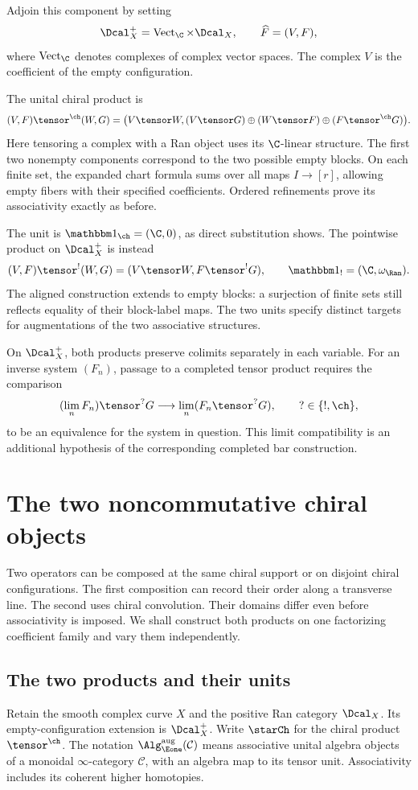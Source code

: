 Adjoin this component by setting
\[
 \Dcal_X^+=\operatorname{Vect}_{\C}\times\Dcal_X,
 \qquad \widehat F=(V,F),
\]
where $\operatorname{Vect}_{\C}$ denotes complexes of complex vector spaces.
The complex $V$ is the coefficient of the empty configuration.

The unital chiral product is
\[
 (V,F)\tensor^{\ch}(W,G)
 =\bigl(V\tensor W,
       (V\tensor G)\oplus(W\tensor F)\oplus(F\tensor^{\ch}G)\bigr).
\]
Here tensoring a complex with a Ran object uses its $\C$-linear structure.
The first two nonempty components correspond to the two possible empty blocks.
On each finite set, the expanded chart formula sums over all maps
$I\to[r]$, allowing empty fibers with their specified coefficients.
Ordered refinements prove its associativity exactly as before.

The unit is $\mathbbm1_{\ch}=(\C,0)$, as direct substitution shows.
The pointwise product on $\Dcal_X^+$ is instead
\[
 (V,F)\tensor^!(W,G)=(V\tensor W,F\tensor^!G),\qquad
 \mathbbm1_!=(\C,\omega_{\Ran}).
\]
The aligned construction extends to empty blocks: a surjection of
finite sets still reflects equality of their block-label maps.
The two units specify distinct targets for augmentations of the
two associative structures.

On $\Dcal_X^+$, both products preserve colimits separately in each variable.
For an inverse system $(F_n)$, passage to a completed tensor product
requires the comparison
\[
 (\lim_n F_n)\tensor^?G\longrightarrow
       \lim_n(F_n\tensor^?G),\qquad ?\in\{!,\ch\},
\]
to be an equivalence for the system in question.
This limit compatibility is an additional hypothesis of the
corresponding completed bar construction.

\chapter{The two noncommutative chiral objects}
\label{cbc:two:chapter}
Two operators can be composed at the same chiral support or on disjoint
chiral configurations. The first composition can record their order
along a transverse line. The second uses chiral convolution.
Their domains differ even before associativity is imposed.
We shall construct both products on one factorizing coefficient family
and vary them independently.

\section{The two products and their units}
Retain the smooth complex curve $X$ and the positive Ran category $\Dcal_X$.
Its empty-configuration extension is $\Dcal_X^+$.
Write $\starCh$ for the chiral product $\tensor^{\ch}$.
The notation $\Alg_{\Eone}^{\mathrm{aug}}(\mathcal C)$ means associative
unital algebra objects of a monoidal $\infty$-category $\mathcal C$,
with an algebra map to its tensor unit.
Associativity includes its coherent higher homotopies.

